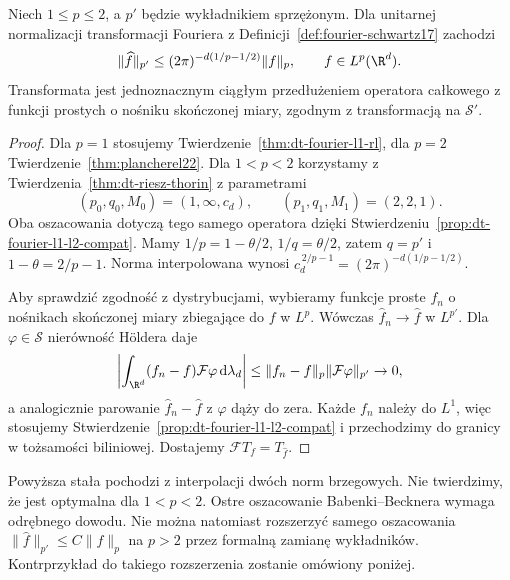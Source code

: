 \begin{twierdzenie}
\label{thm:dt-hausdorff-young}
Niech $1\le p\le2$, a $p'$ będzie wykładnikiem sprzężonym.
Dla unitarnej normalizacji transformacji Fouriera
z Definicji~\ref{def:fourier-schwartz17} zachodzi
\[
 \|\widehat f\|_{p'}
 \le (2\pi)^{-d(1/p-1/2)}\|f\|_p,
 \qquad f\in L^p(\R^d).
\]
Transformata jest jednoznacznym ciągłym przedłużeniem
operatora całkowego z funkcji prostych o nośniku
skończonej miary, zgodnym z transformacją na $\mathcal S'$.
\end{twierdzenie}
\begin{proof}
Dla $p=1$ stosujemy Twierdzenie~\ref{thm:dt-fourier-l1-rl},
dla $p=2$ Twierdzenie~\ref{thm:plancherel22}.
Dla $1<p<2$ korzystamy z Twierdzenia~\ref{thm:dt-riesz-thorin}
z parametrami
\[
 (p_0,q_0,M_0)=(1,\infty,c_d),\qquad
 (p_1,q_1,M_1)=(2,2,1).
\]
Oba oszacowania dotyczą tego samego operatora dzięki
Stwierdzeniu~\ref{prop:dt-fourier-l1-l2-compat}.
Mamy $1/p=1-\theta/2$, $1/q=\theta/2$, zatem
$q=p'$ i $1-\theta=2/p-1$.
Norma interpolowana wynosi
$c_d^{\,2/p-1}=(2\pi)^{-d(1/p-1/2)}$.

Aby sprawdzić zgodność z dystrybucjami, wybieramy
funkcje proste $f_n$ o nośnikach skończonej miary
zbiegające do $f$ w $L^p$. Wówczas
$\widehat f_n\to\widehat f$ w $L^{p'}$.
Dla $\varphi\in\mathcal S$ nierówność Höldera daje
\[
 \left|\int_{\R^d}(f_n-f)\mathcal F\varphi\,
 \mathrm d\lambda_d\right|
 \le\|f_n-f\|_p\|\mathcal F\varphi\|_{p'}\to0,
\]
a analogicznie parowanie $\widehat f_n-\widehat f$
z $\varphi$ dąży do zera. Każde $f_n$ należy do $L^1$,
więc stosujemy
Stwierdzenie~\ref{prop:dt-fourier-l1-l2-compat}
i przechodzimy do granicy w tożsamości biliniowej.
Dostajemy $\mathcal FT_f=T_{\widehat f}$.
\end{proof}

\begin{uwaga}
\label{rem:dt-hy-constant}
Powyższa stała pochodzi z interpolacji dwóch norm
brzegowych. Nie twierdzimy, że jest optymalna dla
$1<p<2$. Ostre oszacowanie Babenki--Becknera
wymaga odrębnego dowodu.
Nie można natomiast rozszerzyć samego oszacowania
$\|\widehat f\|_{p'}\le C\|f\|_p$ na $p>2$
przez formalną zamianę wykładników. Kontrprzykład
do takiego rozszerzenia zostanie omówiony poniżej.
\end{uwaga}

